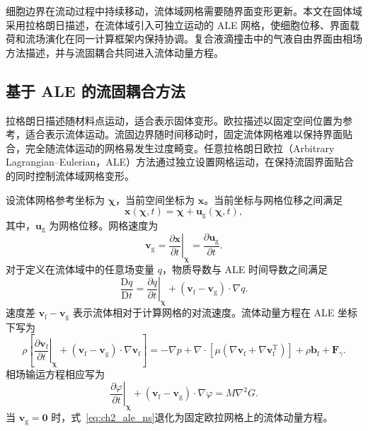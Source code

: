 细胞边界在流动过程中持续移动，流体域网格需要随界面变形更新。本文在固体域采用拉格朗日描述，在流体域引入可独立运动的 ALE 网格，使细胞位移、界面载荷和流场演化在同一计算框架内保持协调。复合液滴撞击中的气液自由界面由相场方法描述，并与流固耦合共同进入流体动量方程。

\subsection{基于 ALE 的流固耦合方法}
\label{subsec:ch2_ale}

拉格朗日描述随材料点运动，适合表示固体变形。欧拉描述以固定空间位置为参考，适合表示流体运动。流固边界随时间移动时，固定流体网格难以保持界面贴合，完全随流体运动的网格易发生过度畸变。任意拉格朗日欧拉（Arbitrary Lagrangian--Eulerian，ALE）方法通过独立设置网格运动，在保持流固界面贴合的同时控制流体域网格变形\cite{hirt1974ale,hughes1981ale,donea2004ale}。

设流体网格参考坐标为 $\boldsymbol{\chi}$，当前空间坐标为 $\boldsymbol{x}$。当前坐标与网格位移之间满足
\begin{equation}
\boldsymbol{x}(\boldsymbol{\chi},t)
=
\boldsymbol{\chi}
+
\boldsymbol{u}_{\mathrm g}(\boldsymbol{\chi},t),
\label{eq:ch2_ale_mapping}
\end{equation}
其中，$\boldsymbol{u}_{\mathrm g}$ 为网格位移。网格速度为
\begin{equation}
\boldsymbol{v}_{\mathrm g}
=
\left.
\frac{\partial\boldsymbol{x}}{\partial t}
\right|_{\boldsymbol{\chi}}
=
\frac{\partial\boldsymbol{u}_{\mathrm g}}{\partial t}.
\label{eq:ch2_mesh_velocity}
\end{equation}
对于定义在流体域中的任意场变量 $q$，物质导数与 ALE 时间导数之间满足
\begin{equation}
\frac{\mathrm{D}q}{\mathrm{D}t}
=
\left.
\frac{\partial q}{\partial t}
\right|_{\boldsymbol{\chi}}
+
\left(
\boldsymbol{v}_{\mathrm f}
-
\boldsymbol{v}_{\mathrm g}
\right)
\cdot\nabla q.
\label{eq:ch2_ale_derivative}
\end{equation}
速度差 $\boldsymbol{v}_{\mathrm f}-\boldsymbol{v}_{\mathrm g}$ 表示流体相对于计算网格的对流速度。流体动量方程在 ALE 坐标下写为
\begin{equation}
\rho
\left[
\left.
\frac{\partial\boldsymbol{v}_{\mathrm f}}{\partial t}
\right|_{\boldsymbol{\chi}}
+
\left(
\boldsymbol{v}_{\mathrm f}-\boldsymbol{v}_{\mathrm g}
\right)
\cdot\nabla\boldsymbol{v}_{\mathrm f}
\right]
=
-\nabla p
+
\nabla\cdot
\left[
\mu
\left(
\nabla\boldsymbol{v}_{\mathrm f}
+
\nabla\boldsymbol{v}_{\mathrm f}^{\mathrm T}
\right)
\right]
+
\rho\boldsymbol{b}_{\mathrm f}
+
\boldsymbol{F}_{\gamma}.
\label{eq:ch2_ale_ns}
\end{equation}
相场输运方程相应写为
\begin{equation}
\left.
\frac{\partial\varphi}{\partial t}
\right|_{\boldsymbol{\chi}}
+
\left(
\boldsymbol{v}_{\mathrm f}-\boldsymbol{v}_{\mathrm g}
\right)
\cdot\nabla\varphi
=
M\nabla^2G.
\label{eq:ch2_ale_cahn_hilliard}
\end{equation}
当 $\boldsymbol{v}_{\mathrm g}=\boldsymbol{0}$ 时，式~\eqref{eq:ch2_ale_ns}退化为固定欧拉网格上的流体动量方程。


